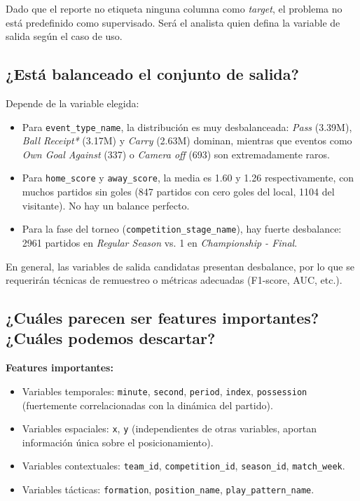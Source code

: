\documentclass[12pt,a4paper]{article}
\begin{document}
Dado que el reporte no etiqueta ninguna columna como \emph{target}, el problema no está predefinido como supervisado. Será el analista quien defina la variable de salida según el caso de uso.

\subsection{¿Está balanceado el conjunto de salida?}

Depende de la variable elegida:

\begin{itemize}
    \item Para \texttt{event\_type\_name}, la distribución es muy desbalanceada: \emph{Pass} (3.39M), \emph{Ball Receipt*} (3.17M) y \emph{Carry} (2.63M) dominan, mientras que eventos como \emph{Own Goal Against} (337) o \emph{Camera off} (693) son extremadamente raros.
    \item Para \texttt{home\_score} y \texttt{away\_score}, la media es 1.60 y 1.26 respectivamente, con muchos partidos sin goles (847 partidos con cero goles del local, 1104 del visitante). No hay un balance perfecto.
    \item Para la fase del torneo (\texttt{competition\_stage\_name}), hay fuerte desbalance: 2961 partidos en \emph{Regular Season} vs. 1 en \emph{Championship - Final}.
\end{itemize}

En general, las variables de salida candidatas presentan desbalance, por lo que se requerirán técnicas de remuestreo o métricas adecuadas (F1-score, AUC, etc.).

\subsection{¿Cuáles parecen ser features importantes? ¿Cuáles podemos descartar?}

\textbf{Features importantes:}

\begin{itemize}
    \item Variables temporales: \texttt{minute}, \texttt{second}, \texttt{period}, \texttt{index}, \texttt{possession} (fuertemente correlacionadas con la dinámica del partido).
    \item Variables espaciales: \texttt{x}, \texttt{y} (independientes de otras variables, aportan información única sobre el posicionamiento).
    \item Variables contextuales: \texttt{team\_id}, \texttt{competition\_id}, \texttt{season\_id}, \texttt{match\_week}.
    \item Variables tácticas: \texttt{formation}, \texttt{position\_name}, \texttt{play\_pattern\_name}.
\end{itemize}
\end{document}
